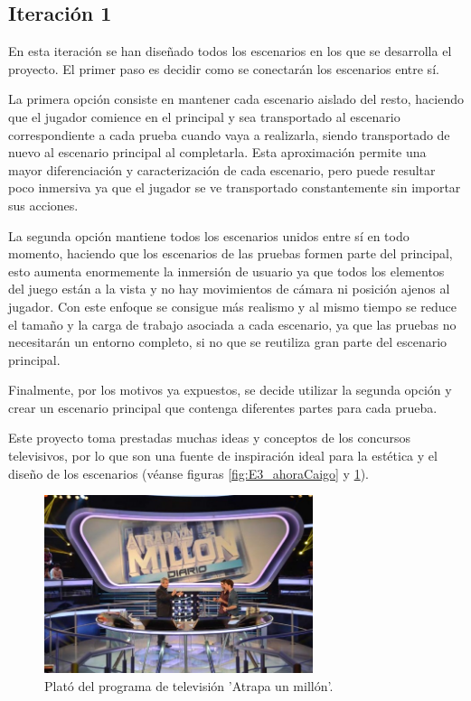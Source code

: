
\subsection{Iteración 1}

En esta iteración se han diseñado todos los escenarios en los que se desarrolla el proyecto.  El primer paso es decidir como se conectarán los escenarios entre sí. 

La primera opción consiste en mantener cada escenario aislado del resto, haciendo que el jugador comience en el principal y sea transportado al escenario correspondiente a cada prueba cuando vaya a realizarla, siendo transportado de nuevo al escenario principal al completarla. Esta aproximación permite una mayor diferenciación y caracterización de cada escenario, pero puede resultar poco inmersiva ya que el jugador se ve transportado constantemente sin importar sus acciones.

La segunda opción mantiene todos los escenarios unidos entre sí en todo momento, haciendo que los escenarios de las pruebas formen parte del principal, esto aumenta enormemente la inmersión de usuario ya que todos los elementos del juego están a la vista y no hay movimientos de cámara ni posición ajenos al jugador. Con este enfoque se consigue más realismo y al mismo tiempo se reduce el tamaño y la carga de trabajo asociada a cada escenario, ya que las pruebas no necesitarán un entorno completo, si no que se reutiliza gran parte del escenario principal. 

Finalmente, por los motivos ya expuestos, se decide utilizar la segunda opción y crear un escenario principal que contenga diferentes partes para cada prueba.

Este proyecto toma prestadas muchas ideas y conceptos de los concursos televisivos, por lo que son una fuente de inspiración ideal para la estética y el diseño de los escenarios (véanse figuras \ref{fig:E3_ahoraCaigo} y \ref{fig:E3_atrapaMillon}).

\begin{figure}
  \centering
    \includegraphics[width=0.7\textwidth]{04.Desarrollo/03.Entrega3/01.Iteracion3_1/00.Figuras/01.atrapa_un_millon.jpg}
    \caption{Plató del programa de televisión 'Atrapa un millón'. \cite{AI_img_atrapaMillon}}
    \label{fig:E3_atrapaMillon}
\end{figure}

